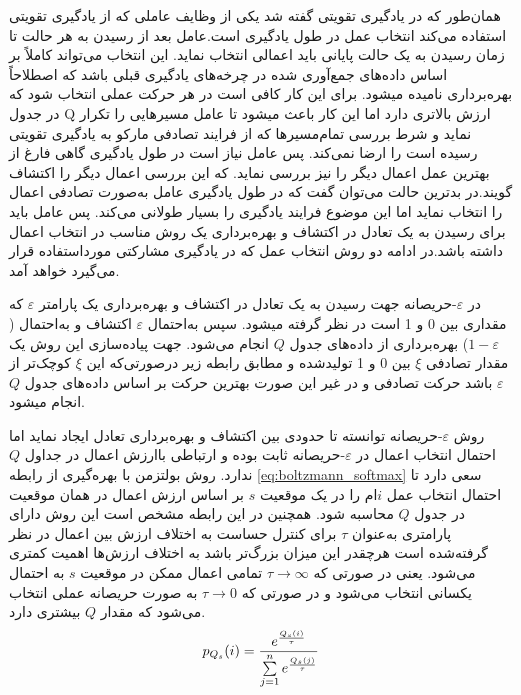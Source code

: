 همان‌طور که در یادگیری تقویتی گفته شد یکی از وظایف عاملی که از یادگیری تقویتی استفاده می‌کند انتخاب عمل در طول یادگیری است.عامل بعد از رسیدن به هر حالت تا زمان رسیدن به یک حالت پایانی باید اعمالی انتخاب نماید. این انتخاب می‌تواند کاملاً بر اساس داده‌های جمع‌آوری شده در چرخه‌های یادگیری قبلی باشد که اصطلاحاً بهره‌برداری نامیده میشود. برای این کار کافی است در هر حرکت عملی انتخاب شود که در جدول Q ارزش بالاتری دارد اما این کار باعث میشود تا عامل مسیرهایی را تکرار نماید و شرط بررسی تمام‌مسیرها که از فرایند تصادفی مارکو به یادگیری تقویتی رسیده است را ارضا نمی‌کند. پس عامل نیاز است در طول یادگیری گاهی فارغ از بهترین عمل اعمال دیگر را نیز بررسی نماید. که این بررسی اعمال دیگر را اکتشاف گویند.در بدترین حالت می‌توان گفت که در طول یادگیری عامل به‌صورت تصادفی اعمال را انتخاب نماید اما این موضوع فرایند یادگیری را بسیار طولانی می‌کند. پس عامل باید برای رسیدن به یک تعادل در اکتشاف و بهره‌برداری یک روش مناسب در انتخاب اعمال داشته باشد.در ادامه دو روش انتخاب عمل که در یادگیری مشارکتی مورداستفاده قرار می‌گیرد خواهد آمد.

در $\varepsilon$-حریصانه جهت رسیدن به یک تعادل در اکتشاف و بهره‌برداری یک پارامتر $\varepsilon$ که مقداری بین 0 و 1 است در نظر گرفته میشود. سپس به‌احتمال $\varepsilon$ اکتشاف و به‌احتمال
($1 - \varepsilon$)
بهره‌برداری از داده‌های جدول $Q$ انجام می‌شود. جهت پیاده‌سازی این روش یک مقدار تصادفی  $\xi$ بین 0 و 1 تولیدشده و مطابق رابطه زیر درصورتی‌که این $\xi$ کوچک‌تر از $\varepsilon$ باشد حرکت تصادفی و در غیر این صورت بهترین حرکت بر اساس داده‌های جدول $Q$ انجام میشود.

روش $\varepsilon$-حریصانه توانسته تا حدودی بین اکتشاف و بهره‌برداری تعادل ایجاد نماید اما احتمال انتخاب اعمال در $\varepsilon$-حریصانه ثابت بوده و ارتباطی باارزش اعمال در جداول $Q$ ندارد. روش بولتزمن با بهره‌گیری از رابطه \ref{eq:boltzmann_softmax} سعی دارد تا احتمال انتخاب عمل $i$ام را در یک موقعیت $s$ بر اساس ارزش اعمال در همان موقعیت در جدول $Q$ محاسبه شود. همچنین در این رابطه مشخص است این روش دارای پارامتری به‌عنوان $\tau$ برای کنترل حساست به اختلاف ارزش بین اعمال در نظر گرفته‌شده است هرچقدر این میزان بزرگ‌تر باشد به اختلاف ارزش‌ها اهمیت کمتری می‌شود. یعنی در صورتی که $\tau \rightarrow \infty$ تمامی اعمال ممکن در موقعیت $s$ به احتمال یکسانی انتخاب می‌شود و در صورتی که $\tau \rightarrow 0$ به صورت حریصانه عملی انتخاب می‌شود که مقدار $Q$ بیشتری دارد.
\begin{equation}\label{eq:boltzmann_softmax}
p_{Q_s}(i) = {e^{Q_s(i) \over \tau} \over \sum\limits_{j = 1}^n e^{Q_s(j) \over \tau}}
\end{equation}